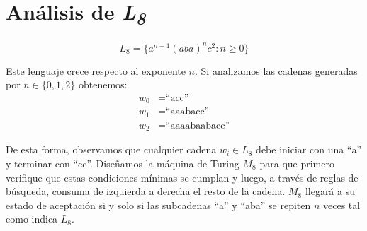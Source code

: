 \documentclass[../main.tex]{subfiles}
\begin{document}
    \section{Análisis de \texorpdfstring{\emph{L\textsubscript{8}}}{L8}}
    \[
        \boxed{L_8=\{a^{n+1}(aba)^nc^2:n\ge0\}}
    \]

    Este lenguaje crece respecto al exponente \(n\). Si analizamos las cadenas generadas por \(n\in\{0,1,2\}\) obtenemos:
    \begin{align*}
        w_0 &= \text{``acc''}\\
        w_1 &=\text{``aaabacc''}\\
        w_2 &=\text{``aaaabaabacc''}
    \end{align*}

    De esta forma, observamos que cualquier cadena \(w_i\in L_8\) debe iniciar con una ``a'' y terminar con ``cc''.
    Diseñamos la máquina de Turing \(M_8\) para que primero verifique que estas condiciones mínimas se cumplan y luego, a través de reglas de búsqueda, consuma de izquierda a derecha el resto de la cadena. \nolinebreak\(M_8\) llegará a su estado de aceptación si y solo si las subcadenas ``a'' y ``aba'' se repiten \(n\) veces tal como indica \(L_8\).
\end{document}
